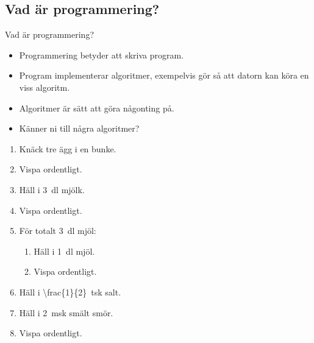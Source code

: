 \subsection{Vad är programmering?}

\begin{frame}
  \begin{block}{Vad är programmering?}
    \begin{itemize}
      \item Programmering betyder att skriva program.
      \item Program implementerar algoritmer, exempelvis gör så att datorn kan 
        köra en viss algoritm.
      \item Algoritmer är sätt att göra någonting på.
    \end{itemize}
  \end{block}

  \pause

  \begin{exercise}
    \begin{itemize}
      \item Känner ni till några algoritmer?
    \end{itemize}
  \end{exercise}
\end{frame}

\begin{frame}
  \begin{example}
    \begin{enumerate}
      \item Knäck tre ägg i en bunke.
      \item Vispa ordentligt.
      \item Häll i \SI{3}{\deci\litre} mjölk.
      \item Vispa ordentligt.
      \item För totalt \SI{3}{\deci\litre} mjöl:
        \begin{enumerate}
          \item Häll i \SI{1}{\deci\litre} mjöl.
          \item Vispa ordentligt.
        \end{enumerate}
      \item Häll i \SI{\frac{1}{2}}{tsk} salt.
      \item Häll i \SI{2}{msk} smält smör.
      \item Vispa ordentligt.
    \end{enumerate}
  \end{example}
\end{frame}

